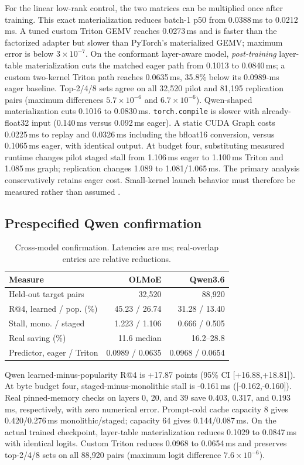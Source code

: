 \documentclass[10pt,twocolumn]{article}
\begin{document}
For the linear low-rank control, the two matrices can be multiplied once after
training.  This exact materialization reduces batch-1 p50 from 0.0388\,ms to
0.0212\,ms.  A tuned custom Triton GEMV reaches 0.0273\,ms and is faster than
the factorized adapter but slower than PyTorch's materialized GEMV; maximum
error is below $3\times10^{-7}$.  On the conformant layer-aware model,
\emph{post-training} layer-table materialization cuts the matched eager path
from 0.1013 to 0.0840\,ms; a custom two-kernel Triton path reaches
0.0635\,ms, 35.8\% below its 0.0989-ms eager baseline.  Top-2/4/8 sets agree
on all 32,520 pilot and 81,195 replication pairs (maximum differences
$5.7\times10^{-6}$ and $6.7\times10^{-6}$).  Qwen-shaped materialization
cuts 0.1016 to 0.0830\,ms.
\texttt{torch.compile} is slower with already-float32 input
(0.140\,ms versus 0.092\,ms eager).  A static CUDA Graph costs 0.0225\,ms to
replay and 0.0326\,ms including the bfloat16 conversion, versus 0.1065\,ms
eager, with identical output.  At budget four, substituting measured runtime
changes pilot staged stall from 1.106\,ms eager to 1.100\,ms Triton and
1.085\,ms graph; replication changes 1.089 to 1.081/1.065\,ms.  The primary
analysis conservatively retains eager cost.  Small-kernel launch behavior must
therefore be measured rather than assumed \cite{tillet2019triton}.

\subsection{Prespecified Qwen confirmation}
\begin{table}[h]
\centering
\small
\setlength{\tabcolsep}{3pt}
\caption{Cross-model confirmation.  Latencies are ms; real-overlap entries
are relative reductions.}
\label{tab:qwen}
\begin{tabular}{lrr}
\toprule
Measure & OLMoE & Qwen3.6\\
\midrule
Held-out target pairs & 32,520 & 88,920\\
R@4, learned / pop. (\%) & 45.23 / 26.74 & 31.28 / 13.40\\
Stall, mono. / staged & 1.223 / 1.106 & 0.666 / 0.505\\
Real saving (\%) & 11.6 median & 16.2--28.8\\
Predictor, eager / Triton & 0.0989 / 0.0635 & 0.0968 / 0.0654\\
\bottomrule
\end{tabular}
\end{table}

Qwen learned-minus-popularity R@4 is +17.87 points (95\% CI
[+16.88,+18.81]).  At byte budget four, staged-minus-monolithic stall is
-0.161\,ms ([-0.162,-0.160]).  Real pinned-memory checks on layers 0, 20,
and 39 save 0.403, 0.317, and 0.193\,ms, respectively, with zero numerical
error.  Prompt-cold cache capacity 8 gives 0.420/0.276\,ms
monolithic/staged; capacity 64 gives 0.144/0.087\,ms.  On the actual trained
checkpoint, layer-table materialization reduces 0.1029 to 0.0847\,ms with
identical logits.  Custom Triton reduces 0.0968 to 0.0654\,ms and preserves
top-2/4/8 sets on all 88,920 pairs (maximum logit difference
$7.6\times10^{-6}$).
\end{document}
